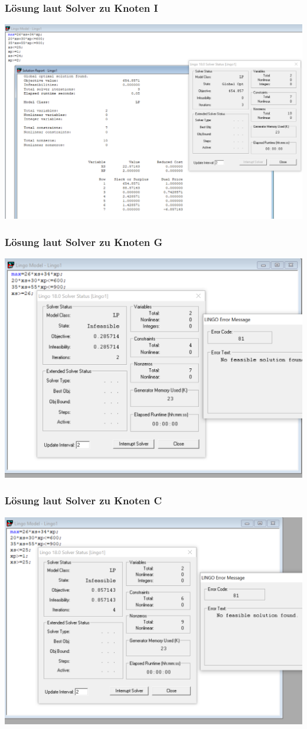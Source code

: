 \documentclass[a4paper,11pt]{article}
\begin{document}
\subsubsection*{Lösung laut Solver zu Knoten I}
\begin{centering}
	\includegraphics[width=0.65\linewidth]{src/blatt_5_aufgabe_2_teilaufgabe_b_knoten_i_loesung_solver.png}
\end{centering}

\subsubsection*{Lösung laut Solver zu Knoten G}
\begin{centering}
	\includegraphics[width=0.65\linewidth]{src/blatt_5_aufgabe_2_teilaufgabe_b_knoten_c_loesung_solver.png}
\end{centering}

\subsubsection*{Lösung laut Solver zu Knoten C}
\begin{centering}
	\includegraphics[width=0.65\linewidth]{src/blatt_5_aufgabe_2_teilaufgabe_b_knoten_g_loesung_solver.png}
\end{centering}
\end{document}
